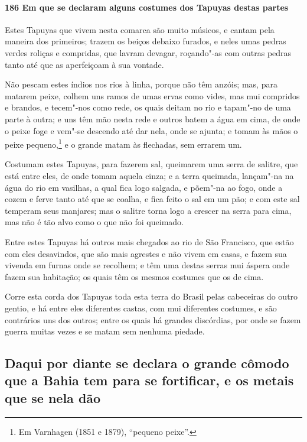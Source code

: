 \paragraph{186 Em que se declaram alguns costumes dos Tapuyas destas partes}

Estes Tapuyas que vivem nesta comarca são muito músicos, e cantam pela maneira dos
primeiros; trazem os beiços debaixo furados, e neles umas pedras verdes roliças e
compridas, que lavram devagar, roçando"-as com outras pedras tanto até que as aperfeiçoam à
sua vontade.

Não pescam estes índios nos rios à linha, porque não têm anzóis; mas, para matarem peixe,
colhem uns ramos de umas ervas como vides, mas mui compridos e brandos, e tecem"-nos como
rede, os quais deitam no rio e tapam"-no de uma parte à outra; e uns têm mão nesta rede e
outros batem a água em cima, de onde o peixe foge e vem"-se descendo até dar nela, onde se
ajunta; e tomam às mãos o peixe pequeno,\footnote{ Em Varnhagen (1851 e 1879), ``pequeno
peixe''.} e o grande matam às flechadas, sem errarem um.

Costumam estes Tapuyas, para fazerem sal, queimarem uma serra de salitre, que está entre
eles, de onde tomam aquela cinza; e a terra queimada, lançam"-na na água do rio em
vasilhas, a qual fica logo salgada, e põem"-na ao fogo, onde a cozem e ferve tanto até que
se coalha, e fica feito o sal em um pão; e com este sal temperam seus manjares; mas o
salitre torna logo a crescer na serra para cima, mas não é tão alvo como o que não foi
queimado.

Entre estes Tapuyas há outros mais chegados ao rio de São Francisco, que estão com eles
desavindos, que são mais agrestes e não vivem em casas, e fazem sua vivenda em furnas onde
se recolhem; e têm uma destas serras mui áspera onde fazem sua habitação; os quais têm os
mesmos costumes que os de cima.

Corre esta corda dos Tapuyas toda esta terra do Brasil pelas cabeceiras do outro gentio, e
há entre eles diferentes castas, com mui diferentes costumes, e são contrários uns dos
outros; entre os quais há grandes discórdias, por onde se fazem guerra muitas vezes e se
matam sem nenhuma piedade.

\subsection{Daqui por diante se declara o grande cômodo que a Bahia tem para se
fortificar, e os metais que se nela dão}

